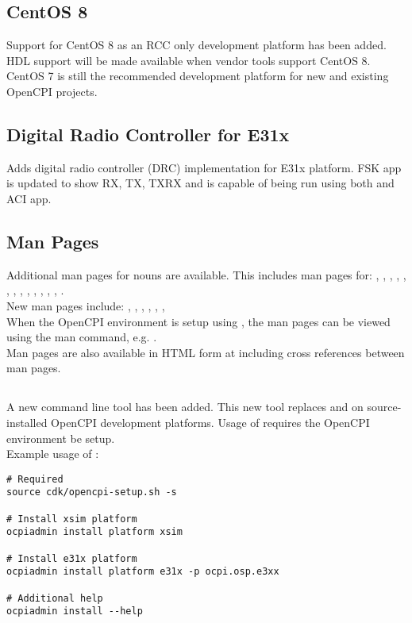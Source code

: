 \subsection{CentOS 8}
\label{sec:20_centos8}
Support for CentOS 8 as an RCC only development platform has been added. HDL support will be made available when vendor tools support CentOS 8. CentOS 7 is still the recommended development platform for new and existing OpenCPI projects.

\subsection{Digital Radio Controller for E31x}
\label{sec:20_digital_radio}
Adds digital radio controller (DRC) implementation for E31x platform. FSK app  is updated to show RX, TX, TXRX and is capable of being run using both  and ACI app.

\subsection{Man Pages}
\label{sec:20_man_pages}
Additional man pages for  nouns are available. This includes man pages for: , , , , , , , , , , , , , .\\

New man pages include: , , , , , , \\

When the OpenCPI environment is setup using , the man pages can be viewed using the man command, e.g. .\\

Man pages are also available in HTML form at  including cross references between man pages.

\subsection{}
\label{sec:20_ocpiadmin}
A new command line tool  has been added. This new tool replaces  and  on source-installed OpenCPI development platforms. Usage of  requires the OpenCPI environment be setup.\\
Example usage of :
\begin{lstlisting}
# Required
source cdk/opencpi-setup.sh -s

# Install xsim platform
ocpiadmin install platform xsim

# Install e31x platform
ocpiadmin install platform e31x -p ocpi.osp.e3xx

# Additional help
ocpiadmin install --help
\end{lstlisting}

